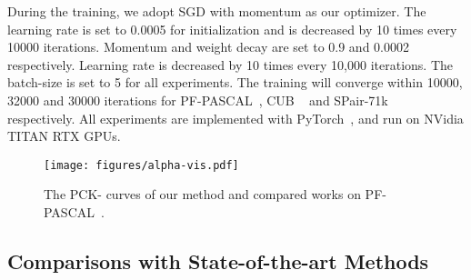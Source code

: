 During the training, we adopt SGD with momentum as our optimizer. The learning rate is set to 0.0005 for initialization and is decreased by 10 times every 10000 iterations. Momentum and weight decay are set to 0.9 and 0.0002 respectively. Learning rate is decreased by 10 times every 10,000 iterations. The batch-size is set to 5 for all experiments. The training will converge within 10000, 32000 and 30000 iterations for PF-PASCAL~\cite{ham2017proposal}, CUB ~\cite{cub} and SPair-71k~\cite{spair} respectively. All experiments are implemented with PyTorch~\cite{pytorch}, and run on NVidia TITAN RTX GPUs.



\begin{figure}[t]
	\centering
	\texttt{[image: figures/alpha-vis.pdf]}
	\caption{The PCK- curves of our method and compared works on PF-PASCAL~\cite{ham2017proposal}.}
	\label{Fig:alpha}
\end{figure}



\subsection{Comparisons with State-of-the-art Methods}\label{comparisons}

